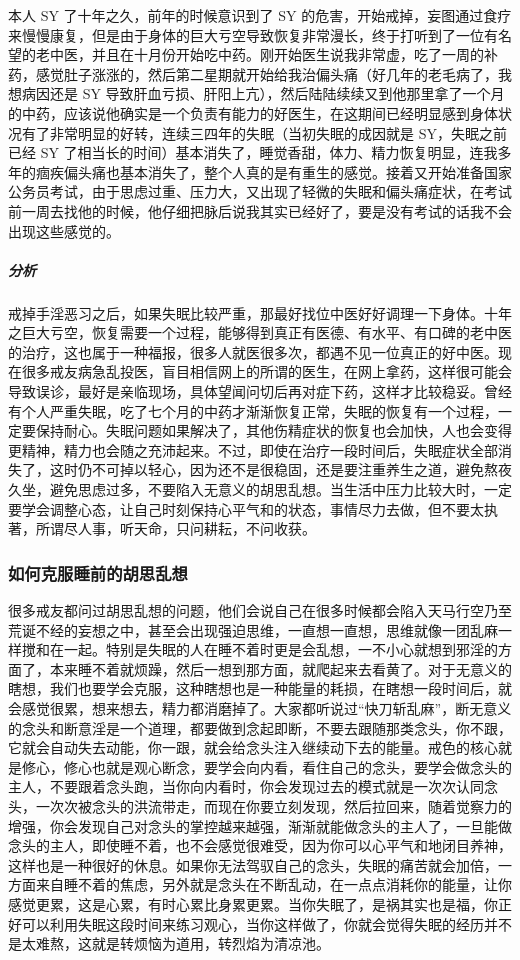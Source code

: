 \begin{case}
    本人 SY 了十年之久，前年的时候意识到了 SY 的危害，开始戒掉，妄图通过食疗来慢慢康复，但是由于身体的巨大亏空导致恢复非常漫长，终于打听到了一位有名望的老中医，并且在十月份开始吃中药。刚开始医生说我非常虚，吃了一周的补药，感觉肚子涨涨的，然后第二星期就开始给我治偏头痛（好几年的老毛病了，我想病因还是 SY 导致肝血亏损、肝阳上亢），然后陆陆续续又到他那里拿了一个月的中药，应该说他确实是一个负责有能力的好医生，在这期间已经明显感到身体状况有了非常明显的好转，连续三四年的失眠（当初失眠的成因就是 SY，失眠之前已经 SY 了相当长的时间）基本消失了，睡觉香甜，体力、精力恢复明显，连我多年的痼疾偏头痛也基本消失了，整个人真的是有重生的感觉。接着又开始准备国家公务员考试，由于思虑过重、压力大，又出现了轻微的失眠和偏头痛症状，在考试前一周去找他的时候，他仔细把脉后说我其实已经好了，要是没有考试的话我不会出现这些感觉的。
    \subparagraph{分析} 戒掉手淫恶习之后，如果失眠比较严重，那最好找位中医好好调理一下身体。十年之巨大亏空，恢复需要一个过程，能够得到真正有医德、有水平、有口碑的老中医的治疗，这也属于一种福报，很多人就医很多次，都遇不见一位真正的好中医。现在很多戒友病急乱投医，盲目相信网上的所谓的医生，在网上拿药，这样很可能会导致误诊，最好是亲临现场，具体望闻问切后再对症下药，这样才比较稳妥。曾经有个人严重失眠，吃了七个月的中药才渐渐恢复正常，失眠的恢复有一个过程，一定要保持耐心。失眠问题如果解决了，其他伤精症状的恢复也会加快，人也会变得更精神，精力也会随之充沛起来。不过，即使在治疗一段时间后，失眠症状全部消失了，这时仍不可掉以轻心，因为还不是很稳固，还是要注重养生之道，避免熬夜久坐，避免思虑过多，不要陷入无意义的胡思乱想。当生活中压力比较大时，一定要学会调整心态，让自己时刻保持心平气和的状态，事情尽力去做，但不要太执著，所谓尽人事，听天命，只问耕耘，不问收获。
\end{case}

\subsubsection{如何克服睡前的胡思乱想}

很多戒友都问过胡思乱想的问题，他们会说自己在很多时候都会陷入天马行空乃至荒诞不经的妄想之中，甚至会出现强迫思维，一直想一直想，思维就像一团乱麻一样搅和在一起。特别是失眠的人在睡不着时更是会乱想，一不小心就想到邪淫的方面了，本来睡不着就烦躁，然后一想到那方面，就爬起来去看黄了。对于无意义的瞎想，我们也要学会克服，这种瞎想也是一种能量的耗损，在瞎想一段时间后，就会感觉很累，想来想去，精力都消磨掉了。大家都听说过“快刀斩乱麻”，断无意义的念头和断意淫是一个道理，都要做到念起即断，不要去跟随那类念头，你不跟，它就会自动失去动能，你一跟，就会给念头注入继续动下去的能量。戒色的核心就是修心，修心也就是观心断念，要学会向内看，看住自己的念头，要学会做念头的主人，不要跟着念头跑，当你向内看时，你会发现过去的模式就是一次次认同念头，一次次被念头的洪流带走，而现在你要立刻发现，然后拉回来，随着觉察力的增强，你会发现自己对念头的掌控越来越强，渐渐就能做念头的主人了，一旦能做念头的主人，即使睡不着，也不会感觉很难受，因为你可以心平气和地闭目养神，这样也是一种很好的休息。如果你无法驾驭自己的念头，失眠的痛苦就会加倍，一方面来自睡不着的焦虑，另外就是念头在不断乱动，在一点点消耗你的能量，让你感觉更累，这是心累，有时心累比身累更累。当你失眠了，是祸其实也是福，你正好可以利用失眠这段时间来练习观心，当你这样做了，你就会觉得失眠的经历并不是太难熬，这就是转烦恼为道用，转烈焰为清凉池。

